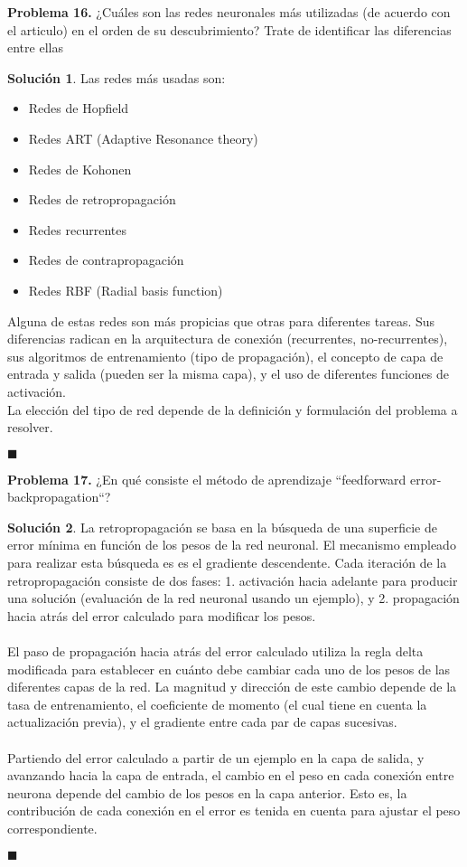 \documentclass[12pt]{article}
\theoremstyle{plain}
\theoremstyle{definition}
\theoremstyle{definition}
\theoremstyle{definition}
\newtheorem*{solution}{Solución}
\begin{document}
\noindent \textbf{Problema 16.}  ¿Cuáles son las redes neuronales  más utilizadas (de acuerdo con el articulo) en el orden de su descubrimiento? Trate de identificar las diferencias entre ellas

\begin{solution}
Las redes más usadas son:
\begin{itemize}
    \item Redes de Hopfield
    \item Redes ART (Adaptive Resonance theory)
    \item Redes de Kohonen
    \item Redes de retropropagación
    \item Redes recurrentes
    \item Redes de contrapropagación
    \item Redes RBF (Radial basis function)
\end{itemize}
Alguna de estas redes son más propicias que otras para diferentes tareas. Sus diferencias radican en la arquitectura de conexión (recurrentes, no-recurrentes), sus algoritmos de entrenamiento (tipo de propagación), el concepto de capa de entrada y salida (pueden ser la misma capa), y el uso de diferentes funciones de activación.\\
La elección del tipo de red depende de la definición y formulación del problema a resolver.
\end{solution}
\begin{flushright}
$\blacksquare$
\end{flushright}
\newpage
\noindent \textbf{Problema 17.} ¿En qué consiste el método de aprendizaje “feedforward error-backpropagation“?
\begin{solution}
La retropropagación se basa en la búsqueda de una superficie de error mínima en función de los pesos de la red neuronal. El mecanismo empleado para realizar esta búsqueda es es el gradiente descendente. Cada iteración de la retropropagación consiste de dos fases: 1. activación hacia adelante para producir una solución (evaluación de la red neuronal usando un ejemplo), y 2. propagación hacia atrás del error calculado para modificar los pesos.\\
\\
El paso de propagación hacia atrás del error calculado utiliza la regla delta modificada para establecer en cuánto debe cambiar cada uno de los pesos de las diferentes capas de la red. La magnitud y dirección de este cambio depende de la tasa de entrenamiento, el coeficiente de momento (el cual tiene en cuenta la actualización previa), y el gradiente entre cada par de capas sucesivas.\\
\\ Partiendo del error calculado a partir de un ejemplo en la capa de salida, y avanzando hacia la capa de entrada, el cambio en el peso en cada conexión entre neurona depende del cambio de los pesos en la capa anterior. Esto es, la contribución de cada conexión en el error es tenida en cuenta para ajustar el peso correspondiente.
\end{solution}
\begin{flushright}
$\blacksquare$
\end{flushright}
\end{document}
